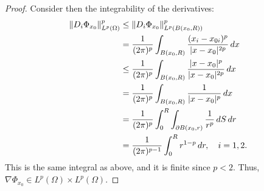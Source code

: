 \documentclass[english, 12pt, a4paper, sci, utf8, a-2b, online]{aaltothesis}
\theoremstyle{definition}
\theoremstyle{plain}
\DeclarePairedDelimiter\abs{\lvert}{\rvert}
\DeclarePairedDelimiter\norm{\lVert}{\rVert}
\newcommand*\diff{\mathop{}\!d}
\numberwithin{equation}{section}
\begin{document}
\begin{proof}
    Consider then the integrability of the derivatives:
    \begin{align*}
        \norm{D_i \Phi_{x_0}}_{L^p(\Omega)}^p
        &\leq \norm{D_i \Phi_{x_0}}_{L^p(B(x_0,R))}^p \\
        &= \frac{1}{(2\pi)^p} \int_{B(x_0,R)}
            \frac{(x_i - x_{0i})^p}{\abs{x-x_0}^{2p}} \diff x \\
        &\leq \frac{1}{(2\pi)^p} \int_{B(x_0,R)}
            \frac{\abs{x-x_0}^p}{\abs{x-x_0}^{2p}} \diff x \\
        &= \frac{1}{(2\pi)^p} \int_{B(x_0,R)}
            \frac{1}{\abs{x-x_0}^p} \diff x \\
        &= \frac{1}{(2\pi)^p} \int_{0}^{R} \int_{\partial B(x_0,r)}
            \frac{1}{r^p} \diff S \diff r \\
        &= \frac{1}{(2\pi)^{p-1}} \int_{0}^{R} r^{1-p} \diff r,
        \quad i=1,2.
    \end{align*}
    This is the same integral as above, and it is finite since $p < 2$.
    Thus, $\nabla \Phi_{x_0} \in L^p(\Omega) \times L^p(\Omega)$.


\end{proof}
\end{document}
